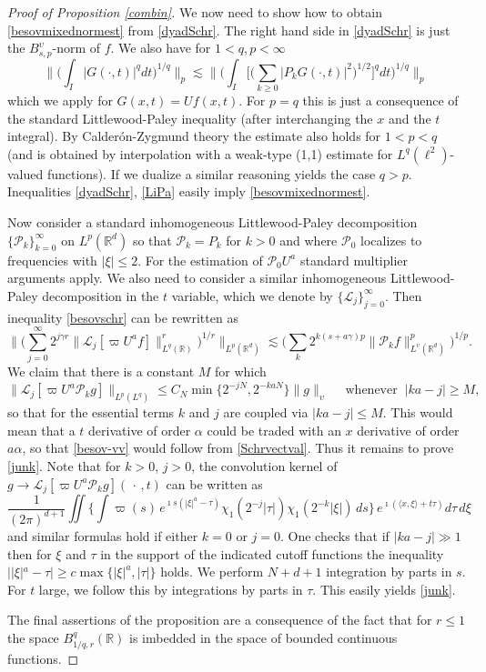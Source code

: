 \documentclass[11pt]{amsart}
\theoremstyle{definition}
\numberwithin{theorem}{section}
\numberwithin{definition}{section}
\renewcommand{\wp}{\upsilon}
\def\im{\imath}
\def\inn#1#2{\langle#1,#2\rangle}
\newcommand{\Be}{\begin{equation}}
\newcommand{\Ee}{\end{equation}}
\newcommand{\note}[1]{\footnote{\texttt{\Small #1}}}
\def\inn#1#2{\langle#1,#2\rangle}
\def\lc{\lesssim}
\def\bbR{{\mathbb {R}}}
\def\cL{{\mathcal {L}}}
\def\cP{{\mathcal {P}}}
\begin{document}
\begin{proof}[Proof of Proposition
\ref{combin}]
We now  need  to show how to obtain   \eqref{besovmixednormest}
 from \eqref{dyadSchr}.
The right hand side in \eqref{dyadSchr} is just the $B^\wp_{s,p}$-norm of $f$.
We also have for $1<q,p<\infty$
\Be\label{LiPa}
\Big\|\Big(\int_I |G(\cdot,t)|^q dt\Big)^{1/q}\Big\|_p
\lc
\Big\|\Big(\int_I
\Big[\Big(\sum_{k\ge 0} |P_k G(\cdot,t)|^2\Big)^{1/2}\Big]^q
dt\Big)^{1/q}\Big\|_p\,
\Ee
which we apply for $G(x,t)=Uf(x,t)$.
For $p=q$ this
 is just a consequence of  the standard Littlewood-Paley
inequality (after interchanging the $x$ and the $t$ integral).
By Calder\'on-Zygmund theory the estimate also holds for $1<p<q$
(and is obtained by interpolation with a weak-type (1,1) estimate for
$L^q(\ell^2)$-valued functions). If we dualize a  similar reasoning
yields the case $q>p$.
Inequalities \eqref{dyadSchr},  \eqref{LiPa} easily imply \eqref{besovmixednormest}.




Now consider a  standard inhomogeneous Littlewood-Paley
decomposition $\{\cP_k\}_{k=0}^\infty$ on $L^p(\bbR^d)$   so that $\cP_k=P_k$ for $k>0$  and where $\cP_0$ localizes to frequencies with $|\xi|\le 2$.
For the  estimation of $\cP_0 U^a$  standard multiplier arguments
 apply.
We also   need to consider a similar inhomogeneous
Littlewood-Paley decomposition in the $t$ variable, which we denote by
$\{\cL_j\}_{j=0}^\infty$.
Then inequality \eqref{besovschr} can be rewritten as
\Be \label{besov-vv}
\Big\| \Big(\sum_{j=0}^\infty 2^{j\gamma r}
\big\|\cL_j [\varpi U^a\! f]\big\|_{L^q(\bbR)}^r\Big)^{1/r}
\Big\|_{L^p(\bbR^d)} \lc
\Big(\sum_k 2^{k(s+a\gamma)p}\big\|\cP_k f\big\|_{L^\wp(\bbR^d)}^p\Big)^{1/p}.
\Ee
We claim that there is a constant $M$ for which
\Be\label{junk}
\big\|\cL_j [\varpi U^a \cP_k g]
\big\|_{L^p(L^q)}
\le C_N \min \{2^{-jN}, 2^{-ka N}\} \|g\|_\wp \quad \text{ whenever } \ |ka-j|\ge M,
\Ee
so that for the essential terms $k$ and $j$ are coupled via
$|ka-j|\le M$.
This would mean that a $t$ derivative of order $\alpha$
could be traded with an $x$ derivative of order $a\alpha$, so that \eqref{besov-vv} would follow from \eqref{Schrvectval}.
Thus it remains to prove \eqref{junk}.
Note that for $k>0$, $j>0$, the convolution kernel of $g\to\cL_j [\varpi U^a \cP_k g](\,\cdot\,,t)$ can be written as
\begin{equation*}
\frac{1}{(2\pi)^{d+1}} \iint  \Big\{\int \varpi(s)\,e^{\im s
(|\xi|^a-\tau)} \chi_1(2^{-j}|\tau|) \chi_1(2^{-k}|\xi|) \, ds\Big\}
\,  e^{\im(\inn x\xi +t\tau)} d\tau\, d\xi
\end{equation*}
and similar formulas hold if either $k=0$ or $j=0$.
One checks that if $|ka-j|\gg 1$ then for $\xi$ and $\tau$ in the support of the indicated cutoff functions the inequality
$||\xi|^a-\tau| \ge c\max \{|\xi|^a, |\tau|\}$
holds. We perform $N+d+1$
integration by parts in $s$. For $t$ large, we  follow this
 by integrations by parts in $\tau$. This easily
yields \eqref{junk}.

The final assertions of the proposition
are a consequence of the fact that for $r\le 1$ the space
$B^q_{1/q, r}(\bbR)$ is imbedded in the space of bounded continuous functions.
\end{proof}
\end{document}
